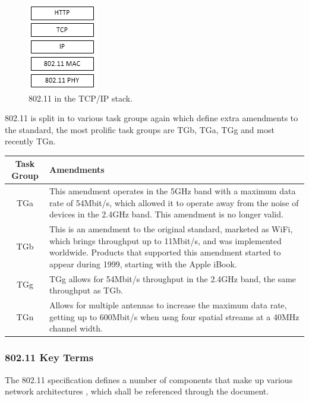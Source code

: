 \begin{figure}[htb!]
	\centering\includegraphics{intro/diagrams/tcpip.png}
	\caption{802.11 in the TCP/IP stack.}
\end{figure}

802.11 is split in to various task groups again which define extra amendments to the standard, the most prolific task groups are TGb, TGa, TGg and most recently TGn.

\begin{table}[htb!]
\begin{center}
	\begin{tabular}{| c | p{ 5cm } |}
		\hline
		\textbf{Task Group} & \textbf{Amendments} \\ \hline
		TGa & This amendment operates in the 5GHz band with a maximum data rate of 54Mbit/s, which allowed it to operate away from the noise of devices in the 2.4GHz band. This amendment is no longer valid. \\ \hline
		TGb & This is an amendment to the original standard, marketed as WiFi, which brings throughput up to 11Mbit/s, and was implemented worldwide. Products that supported this amendment started to appear during 1999, starting with the Apple iBook. \\ \hline
		TGg & TGg allows for 54Mbit/s throughput in the 2.4GHz band, the same throughput as TGb. \\ \hline
		TGn & Allows for multiple antennas to increase the maximum data rate, getting up to 600Mbit/s when usng four spatial streams at a 40MHz channel width. \\ 
		\hline
	\end{tabular}
\end{center}
\end{table}

\subsubsection{802.11 Key Terms}

The 802.11 specification defines a number of components that make up various network architectures \cite{intro:80211_lecture}, which shall be referenced through the document.

